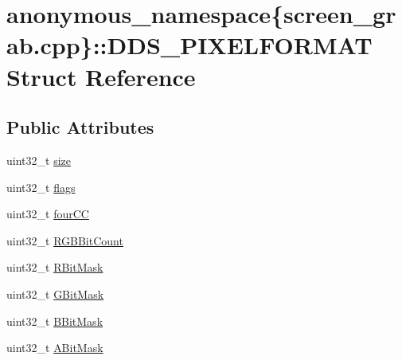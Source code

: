 \hypertarget{structanonymous__namespace_02screen__grab_8cpp_03_1_1_d_d_s___p_i_x_e_l_f_o_r_m_a_t}{}\section{anonymous\+\_\+namespace\{screen\+\_\+grab.\+cpp\}\+:\+:D\+D\+S\+\_\+\+P\+I\+X\+E\+L\+F\+O\+R\+M\+AT Struct Reference}
\label{structanonymous__namespace_02screen__grab_8cpp_03_1_1_d_d_s___p_i_x_e_l_f_o_r_m_a_t}
\subsection*{Public Attributes}
\begin{DoxyCompactItemize}
\item 
uint32\+\_\+t \mbox{\hyperlink{structanonymous__namespace_02screen__grab_8cpp_03_1_1_d_d_s___p_i_x_e_l_f_o_r_m_a_t_a3c8e50b25d0c37cd0c5e184f7361411e}{size}}
\item 
uint32\+\_\+t \mbox{\hyperlink{structanonymous__namespace_02screen__grab_8cpp_03_1_1_d_d_s___p_i_x_e_l_f_o_r_m_a_t_a9496063e8b5026ee5826991975e0ce53}{flags}}
\item 
uint32\+\_\+t \mbox{\hyperlink{structanonymous__namespace_02screen__grab_8cpp_03_1_1_d_d_s___p_i_x_e_l_f_o_r_m_a_t_af138348ad29af95d99cb8c475f6a4420}{four\+CC}}
\item 
uint32\+\_\+t \mbox{\hyperlink{structanonymous__namespace_02screen__grab_8cpp_03_1_1_d_d_s___p_i_x_e_l_f_o_r_m_a_t_af2b8764cad4b720249ceabe0fb4fd825}{R\+G\+B\+Bit\+Count}}
\item 
uint32\+\_\+t \mbox{\hyperlink{structanonymous__namespace_02screen__grab_8cpp_03_1_1_d_d_s___p_i_x_e_l_f_o_r_m_a_t_a528f8c7cd70df7474fdae61384138892}{R\+Bit\+Mask}}
\item 
uint32\+\_\+t \mbox{\hyperlink{structanonymous__namespace_02screen__grab_8cpp_03_1_1_d_d_s___p_i_x_e_l_f_o_r_m_a_t_a84ffb56cd756e1c4fb051bff8f157817}{G\+Bit\+Mask}}
\item 
uint32\+\_\+t \mbox{\hyperlink{structanonymous__namespace_02screen__grab_8cpp_03_1_1_d_d_s___p_i_x_e_l_f_o_r_m_a_t_aaf4015775fe0201df6bda53dff372c27}{B\+Bit\+Mask}}
\item 
uint32\+\_\+t \mbox{\hyperlink{structanonymous__namespace_02screen__grab_8cpp_03_1_1_d_d_s___p_i_x_e_l_f_o_r_m_a_t_a2e1b072ea9328f545072aca6416d3104}{A\+Bit\+Mask}}
\end{DoxyCompactItemize}


